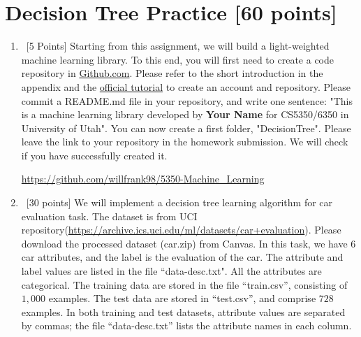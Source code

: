 \documentclass[12pt, fullpage,letterpaper]{article}
\begin{document}
\section{Decision Tree Practice [60 points]}
\begin{enumerate}
	\item~[5 Points] Starting from this assignment, we will build a light-weighted machine learning library. 
To this end, you will first need to create a code repository in \href{https://github.com/}{Github.com}. Please refer to the short introduction in the appendix and the \href{https://guides.github.com/activities/hello-world/}{official tutorial} to create an account and repository. Please commit a README.md file in your repository, and write one sentence: "This is a machine learning library developed by \textbf{Your Name} for CS5350/6350 in University of Utah".  You can now create a first folder, "DecisionTree". Please leave the link to your repository in the homework submission. We will check if you have successfully created it. 

\url{https://github.com/willfrank98/5350-Machine_Learning}

\item~[30 points] We will implement a decision tree learning algorithm for car evaluation task. The dataset is from UCI repository(\url{https://archive.ics.uci.edu/ml/datasets/car+evaluation}). Please download the processed dataset (car.zip) from Canvas.  In this task, we have $6$ car attributes, and the label is the evaluation of the car. The attribute and label values are listed in the file ``data-desc.txt". All the attributes are categorical. The training data are stored in the file ``train.csv'', consisting of $1,000$ examples. The test data are stored in ``test.csv'', and comprise $728$ examples. In both training and test datasets, attribute values are separated by commas; the file ``data-desc.txt''  lists the attribute names in each column. 
\\


\end{enumerate}
\end{document}
